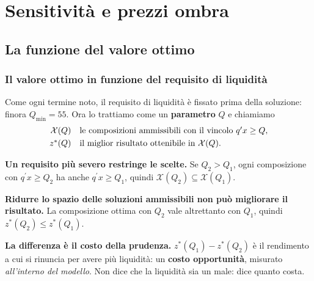 

\section{Sensitivit\`a e prezzi ombra}

\subsection{La funzione del valore ottimo}%

\begin{frame}%
%

\frametitle{Il valore ottimo in funzione del requisito di liquidit\`a}%
%

%


Come ogni termine noto, il requisito di liquidit\`a \`e fissato prima della
soluzione: finora $Q_{\min}=55$. Ora lo trattiamo come un \textbf{parametro}
$Q$ e chiamiamo
\[%
\begin{array}
[c]{rl}%
\mathcal{X}(Q) & \text{le composizioni ammissibili con il vincolo }q^{\prime
}x\geq Q,\\[3pt]%
z^{*}(Q) & \text{il miglior risultato ottenibile in }\mathcal{X}(Q).
\end{array}
\]


\begin{stepitemize}
\item \textbf{Un requisito pi\`u severo restringe le scelte.} Se $Q_{2}>Q_{1}%
$, ogni composizione con $q^{\prime}x\geq Q_{2}$ ha anche $q^{\prime}x\geq
Q_{1}$, quindi $\mathcal{X}(Q_{2})\subseteq\mathcal{X}(Q_{1})$.

\item \textbf{Ridurre lo spazio delle soluzioni ammissibili non pu\`{o}
migliorare il risultato.} La composizione ottima con $Q_{2}$ vale altrettanto
con $Q_{1}$, quindi $z^{\ast}(Q_{2})\leq z^{\ast}(Q_{1})$.

\item \textbf{La differenza \`e il costo della prudenza.} $z^{*}(Q_{1}%
)-z^{*}(Q_{2})$ \`e il rendimento a cui si rinuncia per avere pi\`u
liquidit\`a: un \textbf{costo opportunit\`a}, misurato \emph{all'interno del
modello}. Non dice che la liquidit\`a sia un male: dice quanto costa.
\end{stepitemize}

%

\transboxout
\end{frame}%



